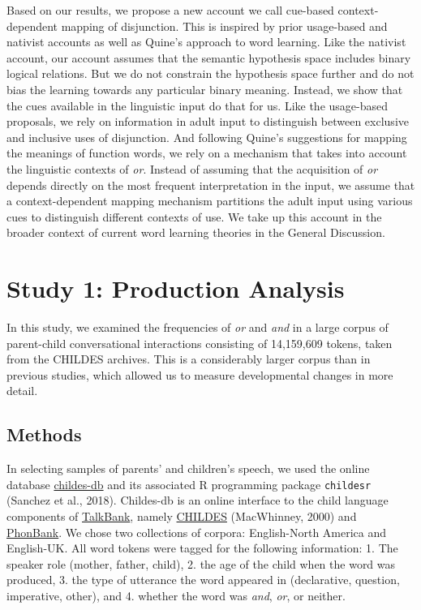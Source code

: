 \documentclass[
  english,
  ,man,floatsintext]{apa6}
\begin{document}
Based on our results, we propose a new account we call cue-based context-dependent mapping of disjunction. This is inspired by prior usage-based and nativist accounts as well as Quine's approach to word learning. Like the nativist account, our account assumes that the semantic hypothesis space includes binary logical relations. But we do not constrain the hypothesis space further and do not bias the learning towards any particular binary meaning. Instead, we show that the cues available in the linguistic input do that for us. Like the usage-based proposals, we rely on information in adult input to distinguish between exclusive and inclusive uses of disjunction. And following Quine's suggestions for mapping the meanings of function words, we rely on a mechanism that takes into account the linguistic contexts of \emph{or}. Instead of assuming that the acquisition of \emph{or} depends directly on the most frequent interpretation in the input, we assume that a context-dependent mapping mechanism partitions the adult input using various cues to distinguish different contexts of use. We take up this account in the broader context of current word learning theories in the General Discussion.

\hypertarget{study-1-production-analysis}{%
\section{Study 1: Production Analysis}\label{study-1-production-analysis}}

In this study, we examined the frequencies of \emph{or} and \emph{and} in a large corpus of parent-child conversational interactions consisting of 14,159,609 tokens, taken from the CHILDES archives. This is a considerably larger corpus than in previous studies, which allowed us to measure developmental changes in more detail.

\hypertarget{methods}{%
\subsection{Methods}\label{methods}}

In selecting samples of parents' and children's speech, we used the online database \href{childes-db.stanford.edu}{childes-db} and its associated R programming package \texttt{childesr} (Sanchez et al., 2018). Childes-db is an online interface to the child language components of \href{https://talkbank.org/}{TalkBank}, namely \href{https://childes.talkbank.org/}{CHILDES} (MacWhinney, 2000) and \href{https://phonbank.talkbank.org/}{PhonBank}. We chose two collections of corpora: English-North America and English-UK. All word tokens were tagged for the following information: 1. The speaker role (mother, father, child), 2. the age of the child when the word was produced, 3. the type of utterance the word appeared in (declarative, question, imperative, other), and 4. whether the word was \emph{and}, \emph{or}, or neither.
\end{document}
